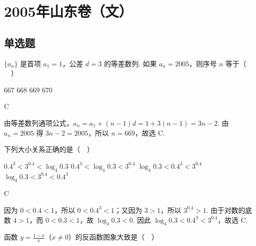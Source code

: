 \chapter{2005年山东卷（文）}
\section{单选题}
\begin{problem}
\(\{a_n\}\) 是首项 \(a_1 = 1\)，公差 \(d = 3\) 的等差数列. 如果 \(a_n = 2005\)，则序号 \(n\) 等于（\(\quad\)）

\choices
    {\(667\)}
    {\(668\)}
    {\(669\)}
    {\(670\)}
\end{problem}

\begin{answer}
C
\end{answer}

\begin{solution}
由等差数列通项公式，\(a_n=a_1+(n-1)d=1+3(n-1)=3n-2\). 由 \(a_n=2005\) 得 \(3n-2=2005\)，所以 \(n=669\)，故选 C.
\end{solution}

\begin{problem}
下列大小关系正确的是（\(\quad\)）

\choices
    {\(0.4^{3} < 3^{0.4} < \log_{4}0.3\)}
    {\(0.4^{3} < \log_{4}0.3 < 3^{0.4}\)}
    {\(\log_{4}0.3 < 0.4^3 < 3^{0.4}\)}
    {\(\log_{4}0.3 < 3^{0.4} < 0.4^3\)}
\end{problem}

\begin{answer}
C
\end{answer}

\begin{solution}
因为 \(0<0.4<1\)，所以 \(0<0.4^3<1\)；又因为 \(3>1\)，所以 \(3^{0.4}>1\). 由于对数的底数 \(4>1\)，而 \(0<0.3<1\)，故 \(\log_4 0.3<0\). 因此 \(\log_4 0.3<0.4^3<3^{0.4}\)，故选 C.
\end{solution}

\begin{problem}
函数 \( y = \frac{1 - x}{x} \)（\(x \neq 0\)）的反函数图象大致是（\(\quad\)）

    {}
    {}
    {}
\end{problem}

